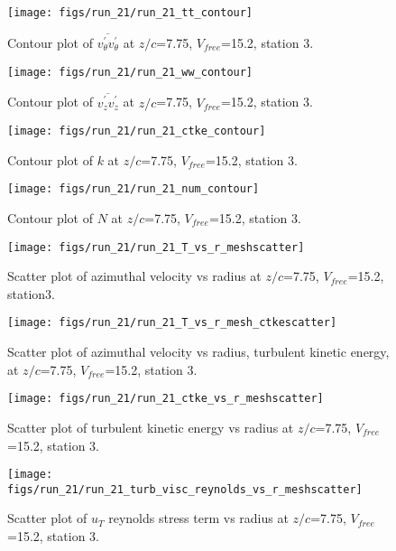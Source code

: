 \begin{figure}[H]
\centering
\texttt{[image: figs/run\_21/run\_21\_tt\_contour]}
\caption{Contour plot of $\overline{v_{\theta}^{\prime} v_{\theta}^{\prime}}$ at $z/c$=7.75, $V_{free}$=15.2, station 3.}
\end{figure}


\begin{figure}[H]
\centering
\texttt{[image: figs/run\_21/run\_21\_ww\_contour]}
\caption{Contour plot of $\overline{v_{z}^{\prime} v_{z}^{\prime}}$ at $z/c$=7.75, $V_{free}$=15.2, station 3.}
\end{figure}


\begin{figure}[H]
\centering
\texttt{[image: figs/run\_21/run\_21\_ctke\_contour]}
\caption{Contour plot of $k$ at $z/c$=7.75, $V_{free}$=15.2, station 3.}
\end{figure}


\begin{figure}[H]
\centering
\texttt{[image: figs/run\_21/run\_21\_num\_contour]}
\caption{Contour plot of $N$ at $z/c$=7.75, $V_{free}$=15.2, station 3.}
\end{figure}


\begin{figure}[H]
\centering
\texttt{[image: figs/run\_21/run\_21\_T\_vs\_r\_meshscatter]}
\caption{Scatter plot of azimuthal velocity vs radius at $z/c$=7.75, $V_{free}$=15.2, station3.}
\end{figure}


\begin{figure}[H]
\centering
\texttt{[image: figs/run\_21/run\_21\_T\_vs\_r\_mesh\_ctkescatter]}
\caption{Scatter plot of azimuthal velocity vs radius, turbulent kinetic energy, at $z/c$=7.75, $V_{free}$=15.2, station 3.}
\end{figure}


\begin{figure}[H]
\centering
\texttt{[image: figs/run\_21/run\_21\_ctke\_vs\_r\_meshscatter]}
\caption{Scatter plot of turbulent kinetic energy vs radius at $z/c$=7.75, $V_{free}$=15.2, station 3.}
\end{figure}


\begin{figure}[H]
\centering
\texttt{[image: figs/run\_21/run\_21\_turb\_visc\_reynolds\_vs\_r\_meshscatter]}
\caption{Scatter plot of $
u_T$ reynolds stress term vs radius at $z/c$=7.75, $V_{free}$=15.2, station 3.}
\end{figure}


